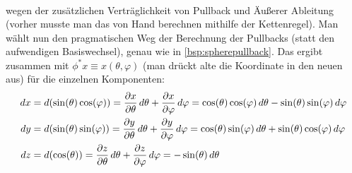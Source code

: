 \documentclass[../H_Analysis_main.tex]{subfiles}
\begin{document}
\begin{bsp}
\begin{align*}
\end{align*}
wegen der zusätzlichen Verträglichkeit von Pullback und Äußerer Ableitung (vorher musste man das von Hand berechnen mithilfe der Kettenregel). Man wählt nun den pragmatischen Weg der Berechnung der Pullbacks (statt den aufwendigen Basiswechsel), genau wie in \ref{bsp:spherepullback}. Das ergibt zusammen mit $\phi^* x \equiv x(\theta, \varphi)$ (man drückt alte die Koordinate in den neuen aus) für die einzelnen Komponenten:
\begin{align*}
dx &= d\qty(\sin(\theta) \cos(\varphi)) = \pdv{x}{\theta} \, d\theta + \pdv{x}{\varphi} \, d\varphi = \cos(\theta) \cos(\varphi) \, d\theta - \sin(\theta) \sin(\varphi) \, d\varphi
\\
dy &= d\qty(\sin(\theta) \sin(\varphi)) = \pdv{y}{\theta} \, d\theta + \pdv{y}{\varphi} \, d\varphi = \cos(\theta) \sin(\varphi) \, d\theta + \sin(\theta) \cos(\varphi) \, d\varphi
\\
dz &= d\qty(\cos(\theta)) = \pdv{z}{\theta} \, d\theta + \pdv{z}{\varphi} \, d\varphi = - \sin(\theta) \, d\theta
\end{align*}



\end{bsp}
\end{document}
